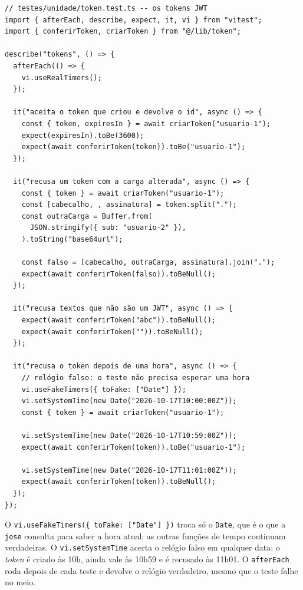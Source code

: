 \begin{codigo}
\begin{Verbatim}[breaklines=true, breaksymbolleft={}, fontsize=\footnotesize]
// testes/unidade/token.test.ts -- os tokens JWT
import { afterEach, describe, expect, it, vi } from "vitest";
import { conferirToken, criarToken } from "@/lib/token";

describe("tokens", () => {
  afterEach(() => {
    vi.useRealTimers();
  });

  it("aceita o token que criou e devolve o id", async () => {
    const { token, expiresIn } = await criarToken("usuario-1");
    expect(expiresIn).toBe(3600);
    expect(await conferirToken(token)).toBe("usuario-1");
  });

  it("recusa um token com a carga alterada", async () => {
    const { token } = await criarToken("usuario-1");
    const [cabecalho, , assinatura] = token.split(".");
    const outraCarga = Buffer.from(
      JSON.stringify({ sub: "usuario-2" }),
    ).toString("base64url");

    const falso = [cabecalho, outraCarga, assinatura].join(".");
    expect(await conferirToken(falso)).toBeNull();
  });

  it("recusa textos que não são um JWT", async () => {
    expect(await conferirToken("abc")).toBeNull();
    expect(await conferirToken("")).toBeNull();
  });

  it("recusa o token depois de uma hora", async () => {
    // relógio falso: o teste não precisa esperar uma hora
    vi.useFakeTimers({ toFake: ["Date"] });
    vi.setSystemTime(new Date("2026-10-17T10:00:00Z"));
    const { token } = await criarToken("usuario-1");

    vi.setSystemTime(new Date("2026-10-17T10:59:00Z"));
    expect(await conferirToken(token)).toBe("usuario-1");

    vi.setSystemTime(new Date("2026-10-17T11:01:00Z"));
    expect(await conferirToken(token)).toBeNull();
  });
});
\end{Verbatim}
\end{codigo}

O \texttt{vi.useFakeTimers(\{ toFake: ["Date"] \})} troca só o \texttt{Date}, que é o que a \texttt{jose} consulta para saber a hora atual; as outras funções de tempo continuam verdadeiras. O \texttt{vi.setSystemTime} acerta o relógio falso em qualquer data: o \textit{token} é criado às 10h, ainda vale às 10h59 e é recusado às 11h01. O \texttt{afterEach} roda depois de cada teste e devolve o relógio verdadeiro, mesmo que o teste falhe no meio.

